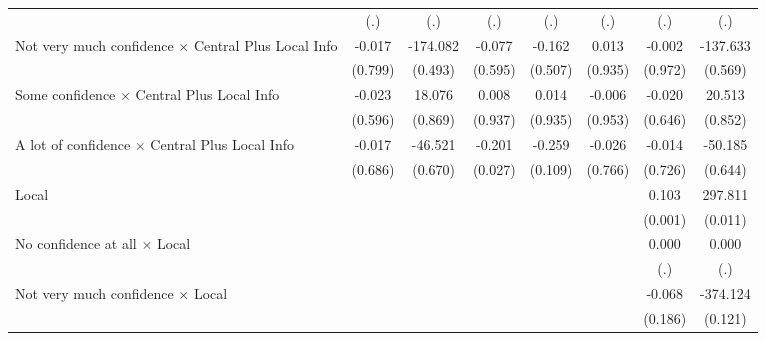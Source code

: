 {\begin{tabular}{l*{7}{c}}
                &      (.)         &      (.)         &      (.)         &      (.)         &      (.)         &      (.)         &      (.)         \\
Not very much confidence $\times$ Central Plus Local Info&   -0.017         & -174.082         &   -0.077         &   -0.162         &    0.013         &   -0.002         & -137.633         \\
                &  (0.799)         &  (0.493)         &  (0.595)         &  (0.507)         &  (0.935)         &  (0.972)         &  (0.569)         \\
Some confidence $\times$ Central Plus Local Info&   -0.023         &   18.076         &    0.008         &    0.014         &   -0.006         &   -0.020         &   20.513         \\
                &  (0.596)         &  (0.869)         &  (0.937)         &  (0.935)         &  (0.953)         &  (0.646)         &  (0.852)         \\
A lot of confidence $\times$ Central Plus Local Info&   -0.017         &  -46.521         &   -0.201\sym{**} &   -0.259         &   -0.026         &   -0.014         &  -50.185         \\
                &  (0.686)         &  (0.670)         &  (0.027)         &  (0.109)         &  (0.766)         &  (0.726)         &  (0.644)         \\
Local           &                  &                  &                  &                  &                  &    0.103\sym{**} &  297.811\sym{**} \\
                &                  &                  &                  &                  &                  &  (0.001)         &  (0.011)         \\
No confidence at all $\times$ Local&                  &                  &                  &                  &                  &    0.000         &    0.000         \\
                &                  &                  &                  &                  &                  &      (.)         &      (.)         \\
Not very much confidence $\times$ Local&                  &                  &                  &                  &                  &   -0.068         & -374.124         \\
                &                  &                  &                  &                  &                  &  (0.186)         &  (0.121)         \\

\end{tabular}}
